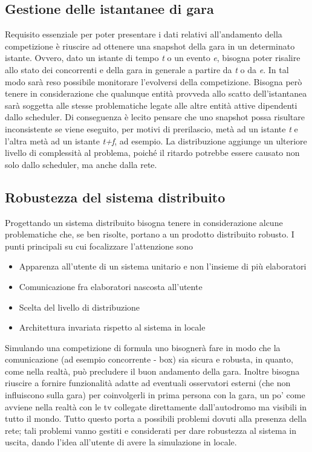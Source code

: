 \subsection{Gestione delle istantanee di gara}
\label{enunciazione_istantanee}
Requisito essenziale per poter presentare i dati relativi all'andamento della
competizione è riuscire ad ottenere una
snapshot della gara in un determinato istante. Ovvero, dato un istante di tempo
\emph{t} o un evento \emph{e}, bisogna
poter risalire allo stato dei concorrenti e della gara in generale a partire da \emph{t} o da \emph{e}. 
In tal modo sarà reso possibile
monitorare l'evolversi della competizione. Bisogna però tenere in considerazione
che qualunque entità provveda allo scatto
dell'istantanea sarà soggetta alle stesse problematiche legate alle altre entità
attive dipendenti dallo scheduler. 
Di conseguenza è lecito pensare che uno snapshot possa risultare inconsistente
se viene eseguito, per motivi di 
prerilascio, metà ad un istante
\emph{t} e l'altra metà ad un istante \emph{t+f}, ad esempio. La distribuzione
aggiunge un ulteriore livello di complessità
al problema, poiché il ritardo potrebbe essere causato non solo dallo scheduler,
ma anche dalla rete.
\subsection{Robustezza del sistema distribuito }
Progettando un sistema distribuito bisogna tenere in considerazione alcune
problematiche che, se ben risolte, portano a un prodotto distribuito robusto.
I punti principali su cui focalizzare l'attenzione sono
\begin{itemize}
\item Apparenza all'utente di un sistema unitario e non l'insieme di pi\`{u}
elaboratori
\item Comunicazione fra elaboratori nascosta all'utente
\item Scelta del livello di distribuzione
\item Architettura invariata rispetto al sistema in locale
\end{itemize}
Simulando una competizione di formula uno bisognerà fare in modo che la comunicazione (ad esempio concorrente - box) sia sicura e robusta, in quanto, come nella realtà, può precludere il buon andamento della gara. Inoltre bisogna riuscire a fornire funzionalità adatte ad eventuali osservatori esterni (che non influiscono sulla gara) per coinvolgerli in prima persona con la gara, un po' come avviene nella realtà con le tv collegate direttamente dall'autodromo ma visibili in tutto il mondo. Tutto questo porta a possibili problemi dovuti alla presenza della rete; tali problemi vanno gestiti e considerati per dare robustezza al sistema in uscita, dando l'idea all'utente di avere la simulazione in locale.
